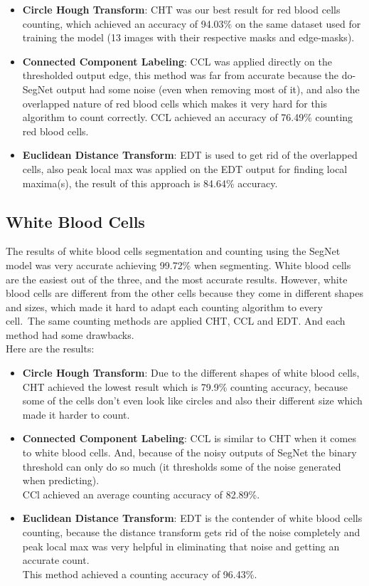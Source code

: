 \begin{itemize}
  \item \textbf{Circle Hough Transform}: CHT was our best result for red blood cells counting, which achieved an accuracy of 94.03\% on the same dataset used for training the model (13 images with their respective masks and edge-masks).
  \item \textbf{Connected Component Labeling}: CCL was applied directly on the thresholded output edge, this method was far from accurate because the do-SegNet output had some noise (even when removing most of it), and also the overlapped nature of red blood cells which makes it very hard for this algorithm to count correctly. CCL achieved an accuracy of 76.49\% counting red blood cells.
  \item \textbf{Euclidean Distance Transform}: EDT is used to get rid of the overlapped cells, also peak local max was applied on the EDT output for finding local maxima(s), the result of this approach is 84.64\% accuracy.
\end{itemize}



\subsection{White Blood Cells}
\hspace{\parindent}
The results of white blood cells segmentation and counting using the SegNet model was very accurate achieving 99.72\% when segmenting.
White blood cells are the easiest out of the three, and the most accurate results.
However, white blood cells are different from the other cells because they come in different shapes and sizes, which made it hard to adapt each counting algorithm to every cell.\
The same counting methods are applied CHT, CCL and EDT. And each method had some drawbacks.\\
Here are the results:

\begin{itemize}
  \item \textbf{Circle Hough Transform}: Due to the different shapes of white blood cells, CHT achieved the lowest result which is 79.9\% counting accuracy, because some of the cells don't even look like circles and also their different size which made it harder to count.
  \item \textbf{Connected Component Labeling}: CCL is similar to CHT when it comes to white blood cells. And, because of the noisy outputs of SegNet the binary threshold can only do so much (it thresholds some of the noise generated when predicting).\\
    CCl achieved an average counting accuracy of 82.89\%.
  \item \textbf{Euclidean Distance Transform}: EDT is the contender of white blood cells counting, because the distance transform gets rid of the noise completely and peak local max was very helpful in eliminating that noise and getting an accurate count.\\
    This method achieved a counting accuracy of 96.43\%.
\end{itemize}

